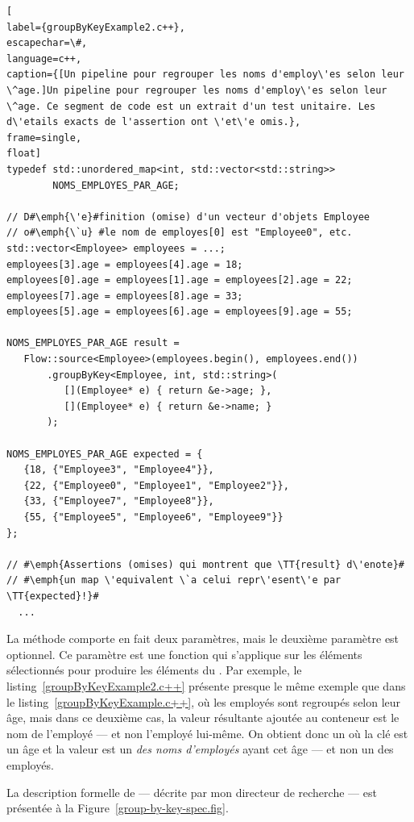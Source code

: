 \begin{lstlisting}[
label={groupByKeyExample2.c++},
escapechar=\#,
language=c++,
caption={[Un pipeline pour regrouper les noms d'employ\'es selon leur \^age.]Un pipeline pour regrouper les noms d'employ\'es selon leur \^age. Ce segment de code est un extrait d'un test unitaire. Les d\'etails exacts de l'assertion ont \'et\'e omis.},
frame=single,
float]
typedef std::unordered_map<int, std::vector<std::string>> 
        NOMS_EMPLOYES_PAR_AGE;

// D#\emph{\'e}#finition (omise) d'un vecteur d'objets Employee 
// o#\emph{\`u} #le nom de employes[0] est "Employee0", etc.
std::vector<Employee> employees = ...; 
employees[3].age = employees[4].age = 18;
employees[0].age = employees[1].age = employees[2].age = 22;
employees[7].age = employees[8].age = 33;
employees[5].age = employees[6].age = employees[9].age = 55;

NOMS_EMPLOYES_PAR_AGE result = 
   Flow::source<Employee>(employees.begin(), employees.end())
       .groupByKey<Employee, int, std::string>(
          [](Employee* e) { return &e->age; },
          [](Employee* e) { return &e->name; }
       );
    
NOMS_EMPLOYES_PAR_AGE expected = {
   {18, {"Employee3", "Employee4"}},
   {22, {"Employee0", "Employee1", "Employee2"}},
   {33, {"Employee7", "Employee8"}},
   {55, {"Employee5", "Employee6", "Employee9"}}
};

// #\emph{Assertions (omises) qui montrent que \TT{result} d\'enote}#
// #\emph{un map \'equivalent \`a celui repr\'esent\'e par \TT{expected}!}#
  ...
\end{lstlisting}


La m\'ethode  comporte en fait deux param\`etres, mais le deuxi\`eme param\`etre est optionnel. Ce param\`etre est une fonction qui s'applique sur les \'el\'ements s\'electionn\'es pour produire les \'el\'ements du . Par exemple,  le listing~\ref{groupByKeyExample2.c++} pr\'esente presque le m\^eme exemple que dans le listing~\ref{groupByKeyExample.c++}, o\`u les employ\'es sont regroup\'es selon leur \^age, mais dans ce deuxi\`eme cas, la valeur r\'esultante ajout\'ee au conteneur est le nom de l'employ\'e --- et non l'employ\'e lui-m\^eme. On obtient donc un  o\`u la cl\'e est un \^age et la valeur est un  \emph{des noms d'employ\'es} ayant cet \^age --- et non un  des employ\'es.


La description formelle de  --- d\'ecrite par mon directeur de recherche --- est pr\'esent\'ee \`a la Figure~\ref{group-by-key-spec.fig}.

